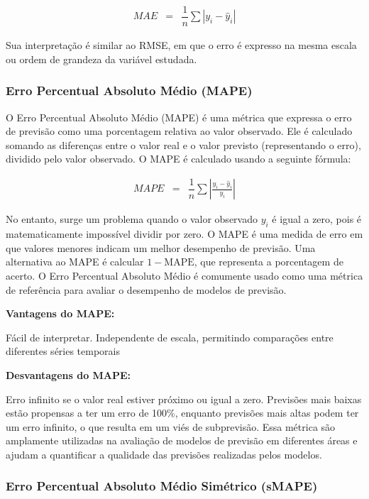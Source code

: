 \begin{eqnarray}
	M A E &=& \dfrac{1}{n} \sum\left|y_i-\hat{y}_i\right|\label{eq:mae}
\end{eqnarray}

Sua interpretação é similar ao RMSE, em que o erro é expresso na mesma escala ou ordem de grandeza da variável estudada.

\subsubsection{Erro Percentual Absoluto M\'edio (MAPE)}

O Erro Percentual Absoluto Médio (MAPE) é uma métrica que expressa o erro de previsão como uma porcentagem relativa ao valor observado. Ele é calculado somando as diferenças entre o valor real e o valor previsto (representando o erro), dividido pelo valor observado.
O MAPE é calculado usando a seguinte fórmula:

\begin{eqnarray}
	MAPE &=& \dfrac{1}{n} \sum\left|\frac{y_i - \hat{y}_i}{y_i}\right|\label{eq:mape}
\end{eqnarray}

No entanto, surge um problema quando o valor observado $y_i$ é igual a zero, pois é matematicamente impossível dividir por zero. O MAPE é uma medida de erro em que valores menores indicam um melhor desempenho de previsão.
Uma alternativa ao MAPE é calcular $1 - \text{MAPE}$, que representa a porcentagem de acerto.
O Erro Percentual Absoluto Médio é comumente usado como uma métrica de referência para avaliar o desempenho de modelos de previsão.

\noindent\textbf{Vantagens do MAPE:}


Fácil de interpretar.
Independente de escala, permitindo comparações entre diferentes séries temporais


\noindent\textbf{Desvantagens do MAPE:}

Erro infinito se o valor real estiver próximo ou igual a zero.
Previsões mais baixas estão propensas a ter um erro de 100\%, enquanto previsões mais altas podem ter um erro infinito, o que resulta em um viés de subprevisão.
Essa métrica são amplamente utilizadas na avaliação de modelos de previsão em diferentes áreas e ajudam a quantificar a qualidade das previsões realizadas pelos modelos.

\subsubsection{Erro Percentual Absoluto M\'edio Sim\'etrico (sMAPE)}


